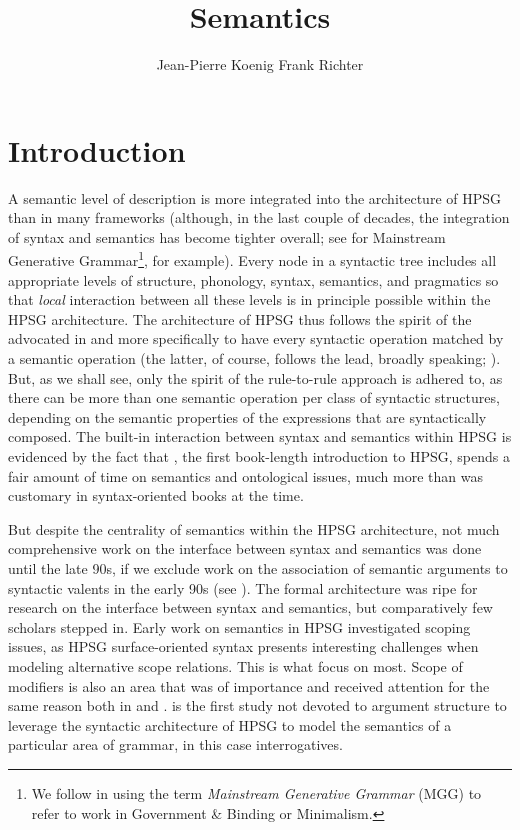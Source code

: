 \documentclass[output=paper
 	        ,biblatex
                ,babelshorthands
                ,newtxmath
                ,draftmode
                ,colorlinks, citecolor=brown
]{langscibook}
\author{%
	Jean-Pierre Koenig\affiliation{University at Buffalo}%
	\lastand Frank Richter\affiliation{Goethe Universität Frankfurt}%
}
\title{Semantics}
\begin{document}
\maketitle
\label{chap-semantics}

\section{Introduction} 

A semantic level of description is more integrated into the architecture of HPSG than in many frameworks  (although, in the last couple of decades, the integration of syntax and semantics has become tighter overall; see \citealt{HeimandKratzer1998} for Mainstream Generative Grammar\footnote{
We follow \citet[]{CJ2005a} in using
the term \emph{Mainstream Generative Grammar} (MGG) to refer to work in Government \& Binding or Minimalism.}, for example). Every node in a syntactic tree includes  all appropriate levels of structure, phonology, syntax, semantics, and pragmatics so that \emph{local} interaction between all these levels is in principle possible within the HPSG architecture. The architecture of HPSG thus follows the spirit of the  advocated in \citet{Bach1976} and more specifically \citet{KleinandSag1985} to have every syntactic operation matched by a semantic operation (the latter, of course, follows the  lead, broadly speaking; \citealt{Ajdukiewicz35a-u,Pollard84a-u,Steedman2000a-u}). But, as we shall see, only the spirit of the rule-to-rule approach is adhered to, as there can be more than one semantic operation per class of syntactic structures, depending on the semantic properties of the expressions that are syntactically composed. The built-in interaction between syntax and semantics within HPSG is evidenced by the fact that \citet{PollardandSag1987}, the first book-length introduction to HPSG, spends a fair amount of time on semantics and ontological issues, much more than was customary in syntax-oriented books at the time.

But despite the centrality of semantics within the HPSG architecture, not much comprehensive work on the interface between syntax and semantics was done  until the late 90s, if we exclude work on the association of semantic arguments to syntactic valents in the early 90s (see ). The formal architecture was ripe for research on the interface between syntax and semantics, but comparatively few scholars stepped in. 
Early work on semantics in HPSG investigated scoping issues, as HPSG surface-oriented syntax presents interesting challenges when modeling alternative scope relations. This is what \citet{PollardandSag1987, PollardandSag1994} focus on most. Scope of modifiers is also an area that was of importance and received attention for the same reason both in \citet{PollardandSag1994} and \citet{Kasper1997}.  is the first study not devoted to argument structure to leverage the syntactic architecture of HPSG to model the semantics of a particular area of grammar, in this case interrogatives. 
\end{document}
